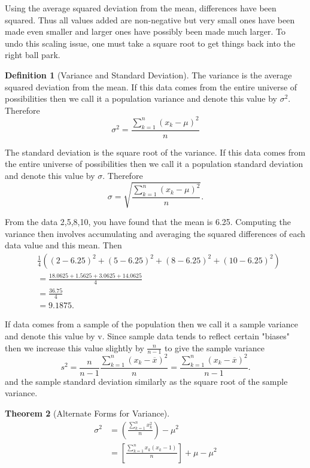 \documentclass[10pt,]{book}
\theoremstyle{plain}
\newtheorem{theorem}{Theorem}[section]
\theoremstyle{definition}
\newtheorem{definition}[theorem]{Definition}
\theoremstyle{definition}
\theoremstyle{definition}
\numberwithin{equation}{section}
\begin{document}
Using the average squared deviation from the mean, differences have been squared. Thus all values added are non-negative but very small ones have been made even smaller and larger ones have possibly been made much larger. To undo this scaling issue, one must take a square root to get things back into the right ball park. 
%
\begin{definition}[Variance and Standard Deviation]\label{definition-14}
The variance is the average squared deviation from the mean. If this data comes from the entire universe of possibilities then we call it a population variance and denote this value by \(\sigma^2\). Therefore
	\begin{equation*} \sigma^2 = \frac{\sum_{k=1}^n ( x_k-\mu )^2}{n} \end{equation*}
%
\par
The standard deviation is the square root of the variance. If this data comes from the entire universe of possibilities then we call it a population standard deviation and denote this value by \(\sigma\). Therefore
\begin{equation*} \sigma = \sqrt{\frac{\sum_{k=1}^n ( x_k-\mu )^2}{n}}.\end{equation*}
%
\par
From the data {2,5,8,10}, you have found that the mean is 6.25. Computing the variance then involves accumulating and averaging the squared differences of each data value and this mean. Then
\begin{align*}
& \frac{1}{4} \left ( (2-6.25)^2 + (5-6.25)^2 + (8-6.25)^2 + (10-6.25)^2 \right ) \\
& = \frac{18.0625 + 1.5625 + 3.0625 + 14.0625}{4} \\
& = \frac{36.75}{4}\\
& = 9.1875.
\end{align*}
\par

If data comes from a sample of the population then we call it a sample variance and denote this value by v. Since sample data tends to reflect certain "biases" then we increase this value slightly by \(\frac{n}{n-1}\) to give the sample variance
\begin{equation*}s^2 = \frac{n}{n-1}\frac{\sum_{k=1}^n ( x_k-\overline{x} )^2}{n} = \frac{\sum_{k=1}^n ( x_k-\overline{x} )^2}{n-1}.\end{equation*}
and the sample standard deviation similarly as the square root of the sample variance.
%
\end{definition}
\begin{theorem}[Alternate Forms for Variance]\label{theorem-7}
\begin{align*}
\sigma^2 & = \left ( \frac{\sum_{k=1}^n x_k^2 }{n} \right ) - \mu^2 \\
& = \left [ \frac{\sum_{k=1}^n x_k(x_k - 1)}{n} \right ] + \mu - \mu^2
\end{align*}\end{theorem}
\end{document}
